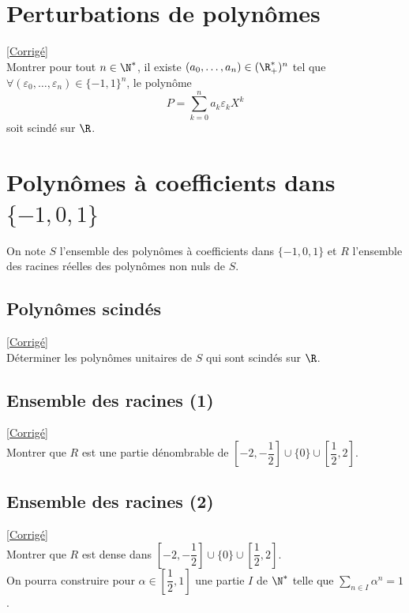 \documentclass{book}
\begin{document}
	\section{Perturbations de polynômes}
	\textcolor{blue}{\hyperref[sec:pertubation-de-polynômes]{[Corrigé]}}\\
	\label{Pertubations de polynômes}
	Montrer pour tout $n\in \N^*$, il existe $(a_0,\dots,a_n)\in (\R^*_+)^n$ tel que $\forall (\varepsilon_0,\dots,\varepsilon_n)\in \{-1,1\}^n$, le polynôme
	$$P=\sum_{k=0}^na_k\varepsilon_kX^k$$
	soit scindé sur $\R$.
	
	\section{Polynômes à coefficients dans $\{-1,0,1\}$}
	On note $S$ l'ensemble des polynômes à coefficients dans $\{-1,0,1\}$ et $R$ l'ensemble des racines réelles des polynômes non nuls de $S$.
	
	\subsection{Polynômes scindés}
	\textcolor{blue}{\hyperref[sec:polynômes-scindés]{[Corrigé]}}\\
	\label{Polynômes scindés}
	Déterminer les polynômes unitaires de $S$ qui sont scindés sur $\R$.
	
	\subsection{Ensemble des racines (1)}
	\textcolor{blue}{\hyperref[sec:ensemble-des-racines-(1)]{[Corrigé]}}\\
	\label{Ensemble des racines (1)}
	Montrer que $R$ est une partie dénombrable de $\left[-2,-\dfrac{1}{2}\right]\cup\{0\}\cup\left[\dfrac{1}{2},2\right]$.
	
	\subsection{Ensemble des racines (2)}
	\textcolor{blue}{\hyperref[sec:ensemble-des-racines-(2)]{[Corrigé]}}\\
	\label{Ensemble des racines (2)}
	Montrer que $R$ est dense dans $\left[-2,-\dfrac{1}{2}\right]\cup\{0\}\cup\left[\dfrac{1}{2},2\right]$.\\
	On pourra construire pour $\alpha\in \left[\dfrac{1}{2},1\right]$ une partie $I$ de $\N^*$ telle que $\displaystyle\sum_{n\in I}\alpha^n=1$.
	
\end{document}
